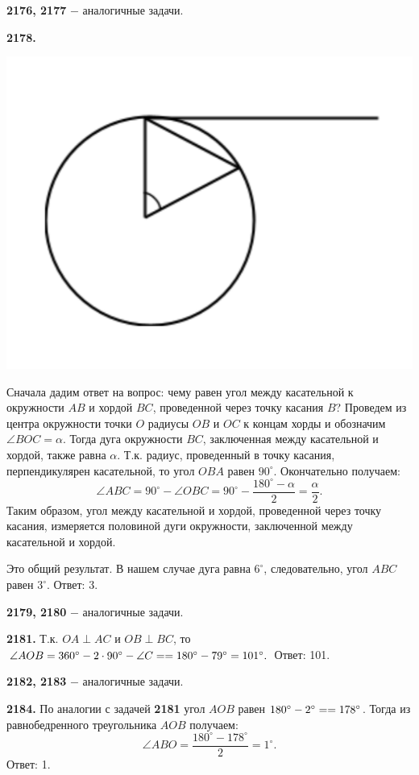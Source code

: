 \textbf{2176, 2177} $-$ аналогичные задачи.

\textbf{2178.}

{\centering \includegraphics[width=0.35\linewidth]{Geometry/Content/48.png}
	
}

Сначала дадим ответ на вопрос: чему равен угол между касательной к окружности $AB$ и хордой $BC$, проведенной через точку касания $B$? Проведем из центра окружности точки $O$ радиусы $OB$ и $OC$ к концам хорды и обозначим $\angle BOC=\alpha$. Тогда дуга окружности $BC$, заключенная между касательной и хордой, также равна $\alpha$. Т.к. радиус, проведенный в точку касания, перпендикулярен касательной, то угол $OBA$ равен $90^\circ$. Окончательно получаем: 
\[
\angle ABC = 90^\circ - \angle OBC = 90^\circ-\frac{180^\circ-\alpha}{2}=\frac{\alpha}{2}.
\]
Таким образом, угол между касательной и хордой, проведенной через точку касания, измеряется половиной дуги окружности, заключенной между касательной и хордой. 

Это общий результат. В нашем случае дуга равна $6^\circ$, следовательно, угол $ABC$ равен $3^\circ$. \newline \null \hspace*{\fill} Ответ: 3.

\textbf{2179, 2180} $-$ аналогичные задачи.

\textbf{2181.} Т.к. $OA \perp AC$ и $OB \perp BC$, то $\angle AOB = 360^\circ - 2\cdot90^\circ - \angle C = \linebreak =180^\circ-79^\circ=101^\circ.$ \newline \null \hspace*{\fill} Ответ: 101.

\textbf{2182, 2183} $-$ аналогичные задачи.

\textbf{2184.} По аналогии с задачей \textbf{2181} угол $AOB$ равен $180^\circ-2^\circ=\linebreak=178^\circ$. Тогда из равнобедренного треугольника $AOB$ получаем:
\[
\angle ABO=\frac{180^\circ-178^\circ}{2}=1^\circ.
\] \null \hspace*{\fill} Ответ: 1.

